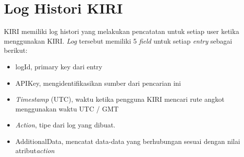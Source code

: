 \section{Log Histori KIRI}

KIRI memiliki log histori yang melakukan pencatatan untuk setiap user ketika menggunakan KIRI. \textsl{Log} tersebut memiliki 5 \textsl{field} untuk setiap \textsl{entry} sebagai berikut:
\begin{itemize}
	\item logId, primary key dari entry
	\item APIKey, mengidentifikasikan sumber dari pencarian ini
	\item \textsl{Timestamp} (UTC), waktu ketika pengguna KIRI mencari rute angkot menggunakan waktu UTC / GMT
	\item \textsl{Action}, tipe dari log yang dibuat.
	\item AdditionalData, mencatat data-data yang berhubungan sesuai dengan nilai atribut\textsl{action}
\end{itemize}

